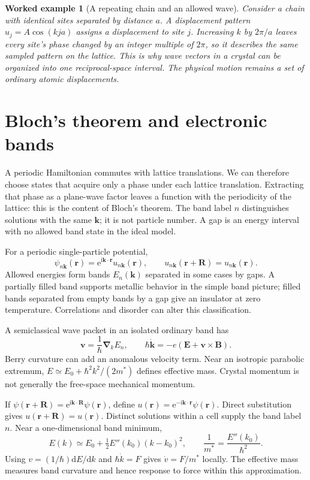 \documentclass[11pt,oneside]{book}
\newcommand{\dd}{\mathrm{d}}
\newcommand{\ii}{\mathrm{i}}
\newcommand{\ee}{\mathrm{e}}
\newcommand{\vect}[1]{\boldsymbol{#1}}
\newcommand{\grad}{\boldsymbol{\nabla}}
\theoremstyle{reviewstyle}
\newtheorem{example}{Worked example}[chapter]
\begin{document}
\begin{example}[A repeating chain and an allowed wave]
Consider a chain with identical sites separated by distance $a$. A displacement pattern $u_j=A\cos(kja)$ assigns a displacement to site $j$. Increasing $k$ by $2\pi/a$ leaves every site's phase changed by an integer multiple of $2\pi$, so it describes the same sampled pattern on the lattice. This is why wave vectors in a crystal can be organized into one reciprocal-space interval. The physical motion remains a set of ordinary atomic displacements.
\end{example}

\section{Bloch's theorem and electronic bands}
A periodic Hamiltonian commutes with lattice translations. We can therefore choose states that acquire only a phase under each lattice translation. Extracting that phase as a plane-wave factor leaves a function with the periodicity of the lattice: this is the content of Bloch's theorem. The band label $n$ distinguishes solutions with the same $\vect k$; it is not particle number. A gap is an energy interval with no allowed band state in the ideal model.

For a periodic single-particle potential,
\begin{equation}\psi_{n\vect k}(\vect r)=\ee^{\ii\vect k\cdot\vect r}u_{n\vect k}(\vect r),\qquad u_{n\vect k}(\vect r+\vect R)=u_{n\vect k}(\vect r).\end{equation}
Allowed energies form bands $E_n(\vect k)$ separated in some cases by gaps. A partially filled band supports metallic behavior in the simple band picture; filled bands separated from empty bands by a gap give an insulator at zero temperature. Correlations and disorder can alter this classification.

A semiclassical wave packet in an isolated ordinary band has
\begin{equation}\vect v=\frac1\hbar\grad_{\!k}E_n,\qquad \hbar\dot{\vect k}=-e(\vect E+\vect v\times\vect B).\end{equation}
Berry curvature can add an anomalous velocity term. Near an isotropic parabolic extremum, $E\simeq E_0+\hbar^2k^2/(2m^*)$ defines effective mass. Crystal momentum is not generally the free-space mechanical momentum.

If $\psi(\vect r+\vect R)=\ee^{\ii\vect k\cdot\vect R}\psi(\vect r)$, define $u(\vect r)=\ee^{-\ii\vect k\cdot\vect r}\psi(\vect r)$. Direct substitution gives $u(\vect r+\vect R)=u(\vect r)$. Distinct solutions within a cell supply the band label $n$. Near a one-dimensional band minimum,
\begin{equation}
E(k)\simeq E_0+\tfrac12E''(k_0)(k-k_0)^2,
\qquad \frac1{m^*}=\frac{E''(k_0)}{\hbar^2}.
\end{equation}
Using $v=(1/\hbar)\dd E/\dd k$ and $\hbar\dot k=F$ gives $\dot v=F/m^*$ locally. The effective mass measures band curvature and hence response to force within this approximation.
\end{document}
